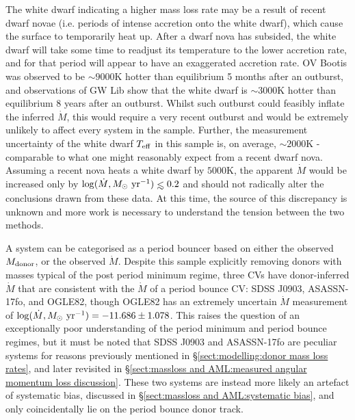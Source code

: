 The white dwarf indicating a higher mass loss rate may be a result of recent dwarf novae (i.e. periods of intense accretion onto the white dwarf), which cause the surface to temporarily heat up. After a dwarf nova has subsided, the white dwarf will take some time to readjust its temperature to the lower accretion rate, and for that period will appear to have an exaggerated accretion rate.
OV Bootis \citep{Schwope2021} was observed to be $\sim 9000$K hotter than equilibrium 5 months after an outburst, and observations of GW Lib \citep{Szkody2016} show that the white dwarf is $\sim 3000$K hotter than equilibrium 8 years after an outburst.
Whilst such outburst could feasibly inflate the inferred $\dot M$, this would require a very recent outburst and would be extremely unlikely to affect every system in the sample. Further, the measurement uncertainty of the white dwarf $T_{\rm eff}$ in this sample is, on average, $\sim 2000$K - comparable to what one might reasonably expect from a recent dwarf nova. Assuming a recent nova heats a white dwarf by $5000$K, the apparent $\dot M$ would be increased only by $\log (\dot M, M_\odot\ {\rm yr}^{-1})\lesssim 0.2$ and should not radically alter the conclusions drawn from these data.
At this time, the source of this discrepancy is unknown and more work is necessary to understand the tension between the two methods.

A system can be categorised as a period bouncer based on either the observed $M_{\rm donor}$, or the observed $\dot M$.
Despite this sample explicitly removing donors with masses typical of the post period minimum regime, three CVs have donor-inferred $\dot M$ that are consistent with the $\dot M$ of a period bounce CV: SDSS J0903, ASASSN-17fo, and OGLE82, though OGLE82 has an extremely uncertain $\dot M$ measurement of $\log (\dot M, M_\odot\ {\rm yr}^{-1}) = -11.686 \pm 1.078$.
This raises the question of an exceptionally poor understanding of the period minimum and period bounce regimes, but it must be noted that SDSS J0903 and ASASSN-17fo are peculiar systems for reasons previously mentioned in \S\ref{sect:modelling:donor mass loss rates}, and later revisited in \S\ref{sect:massloss and AML:measured angular momentum loss discussion}.
These two systems are instead more likely an artefact of systematic bias, discussed in \S\ref{sect:massloss and AML:systematic bias}, and only coincidentally lie on the period bounce donor track.

